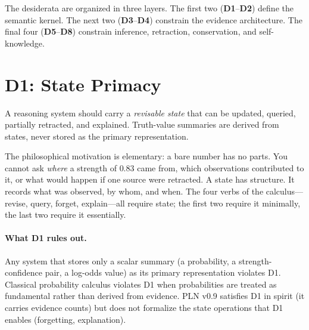 \bigskip

The desiderata are organized in three layers.  The first two
(\textbf{D1}--\textbf{D2}) define the semantic kernel.  The next two
(\textbf{D3}--\textbf{D4}) constrain the evidence architecture.
The final four (\textbf{D5}--\textbf{D8}) constrain inference,
retraction, conservation, and self-knowledge.



\section{D1: State Primacy}
\label{sec:d1}

\begin{definition}
\label{def:d1}
A reasoning system should carry a \emph{revisable state} that can be
updated, queried, partially retracted, and explained.  Truth-value
summaries are derived from states, never stored as the primary
representation.
\end{definition}

\noindent
The philosophical motivation is elementary: a bare number has no parts.
You cannot ask \emph{where} a strength of $0.83$ came from, which
observations contributed to it, or what would happen if one source were
retracted.  A state has structure.  It records what was observed, by
whom, and when.  The four verbs of the calculus---revise, query,
forget, explain---all require state; the first two require it
minimally, the last two require it essentially.

\paragraph{What D1 rules out.}
Any system that stores only a scalar summary (a probability, a
strength-confidence pair, a log-odds value) as its primary
representation violates D1.  Classical probability calculus violates D1
when probabilities are treated as fundamental rather than derived from
evidence.  PLN v0.9 satisfies D1 in spirit (it carries evidence
counts) but does not formalize the state operations that D1 enables
(forgetting, explanation).

